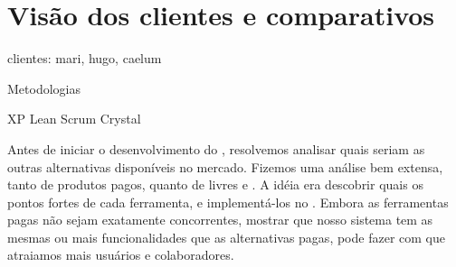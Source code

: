 \section{Visão dos clientes e comparativos}

clientes: mari, hugo, caelum

Metodologias

XP
Lean
Scrum
Crystal


Antes de iniciar o desenvolvimento do \calopsita, resolvemos analisar quais seriam as outras alternativas disponíveis no mercado. Fizemos uma análise bem extensa, tanto de produtos pagos, quanto de livres e \opensource. A idéia era descobrir quais os pontos fortes de cada ferramenta, e implementá-los no \calopsita. Embora as ferramentas pagas não sejam exatamente concorrentes, mostrar que nosso sistema tem as mesmas ou mais funcionalidades que as alternativas pagas, pode fazer com que atraiamos mais usuários e colaboradores.

